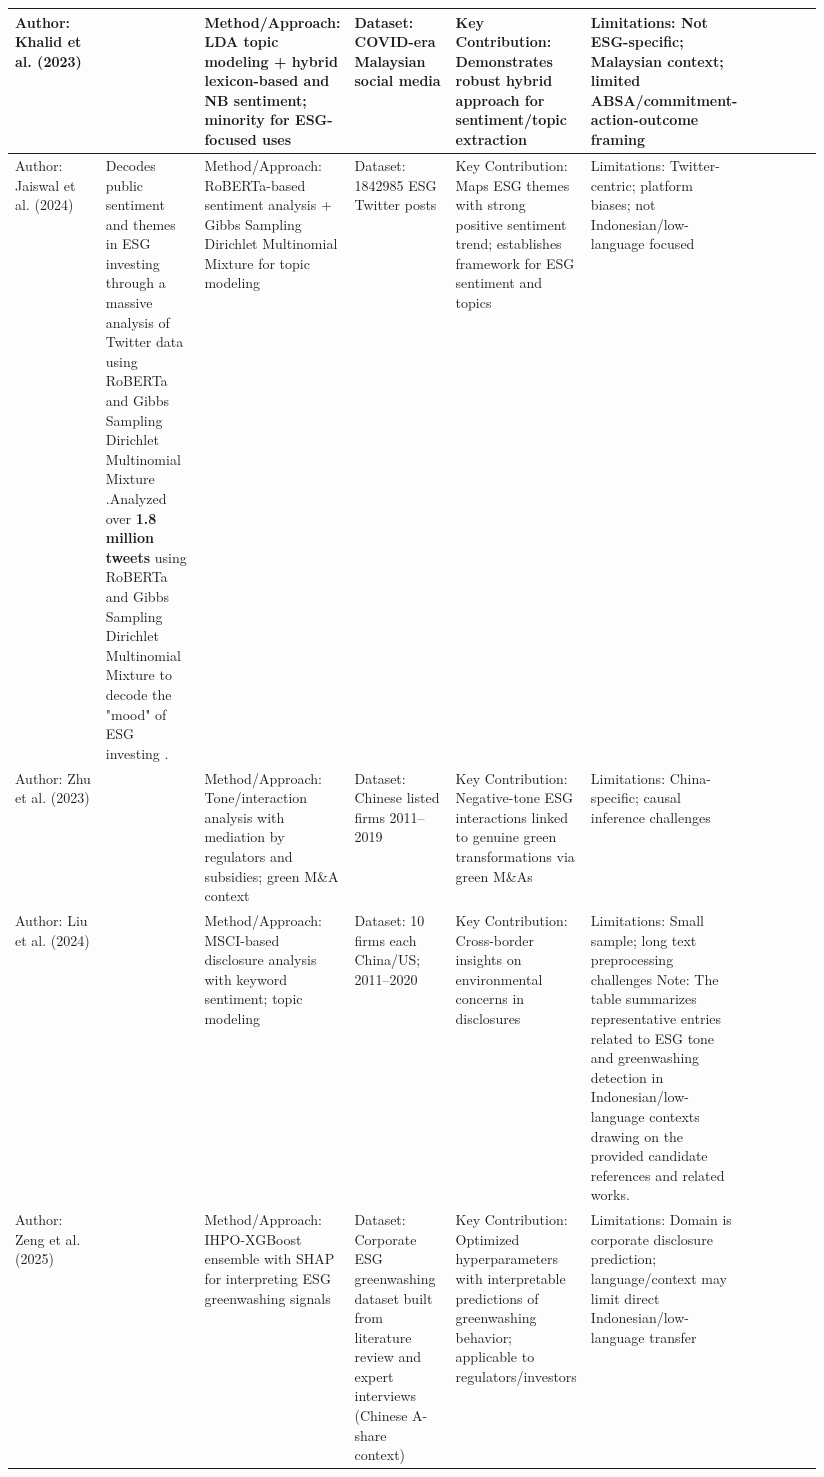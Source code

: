 \documentclass{article}
\begin{document}
\begin{landscape}
\begin{longtable}{p{0.134\linewidth} p{0.134\linewidth} p{0.134\linewidth} p{0.134\linewidth} p{0.134\linewidth} p{0.134\linewidth} p{0.134\linewidth}}
Author: Khalid et al. (2023) & ~ & Method/Approach: LDA topic modeling + hybrid lexicon-based and NB sentiment; minority for ESG-focused uses & Dataset: COVID-era Malaysian social media & Key Contribution: Demonstrates robust hybrid approach for sentiment/topic extraction & Limitations: Not ESG-specific; Malaysian context; limited ABSA/commitment-action-outcome framing & ~ \\ \hline
Author: Jaiswal et al. (2024) & Decodes public sentiment and themes in ESG investing through a massive analysis of Twitter data using RoBERTa and Gibbs Sampling Dirichlet Multinomial Mixture  \parencite{rachana_jaiswal_8eee1b17}.Analyzed over \textbf{1.8 million tweets} using RoBERTa and Gibbs Sampling Dirichlet Multinomial Mixture to decode the "mood" of ESG investing  \parencite{rachana_jaiswal_8eee1b17}. & Method/Approach: RoBERTa-based sentiment analysis + Gibbs Sampling Dirichlet Multinomial Mixture for topic modeling & Dataset: 1842985 ESG Twitter posts & Key Contribution: Maps ESG themes with strong positive sentiment trend; establishes framework for ESG sentiment and topics & Limitations: Twitter-centric; platform biases; not Indonesian/low-language focused & ~ \\ \hline
Author: Zhu et al. (2023) & ~ & Method/Approach: Tone/interaction analysis with mediation by regulators and subsidies; green M\&A context & Dataset: Chinese listed firms 2011–2019 & Key Contribution: Negative-tone ESG interactions linked to genuine green transformations via green M\&As & Limitations: China-specific; causal inference challenges & ~ \\ \hline
Author: Liu et al. (2024) & ~ & Method/Approach: MSCI-based disclosure analysis with keyword sentiment; topic modeling & Dataset: 10 firms each China/US; 2011–2020 & Key Contribution: Cross-border insights on environmental concerns in disclosures & Limitations: Small sample; long text preprocessing challenges Note: The table summarizes representative entries related to ESG tone and greenwashing detection in Indonesian/low-language contexts drawing on the provided candidate references and related works. & ~ \\ \hline
Author: Zeng et al. (2025) & ~ & Method/Approach: IHPO-XGBoost ensemble with SHAP for interpreting ESG greenwashing signals & Dataset: Corporate ESG greenwashing dataset built from literature review and expert interviews (Chinese A-share context) & Key Contribution: Optimized hyperparameters with interpretable predictions of greenwashing behavior; applicable to regulators/investors & Limitations: Domain is corporate disclosure prediction; language/context may limit direct Indonesian/low-language transfer & ~ \\ \hline

\end{longtable}
\end{landscape}
\end{document}
